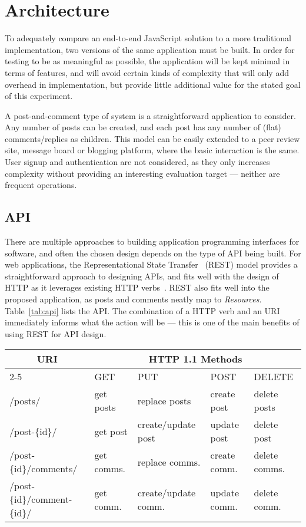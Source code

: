 \section{\label{sec:arch}Architecture}

To adequately compare an end-to-end JavaScript solution to a more traditional implementation, two versions of the same application must be built. In order for testing to be as meaningful as possible, the application will be kept minimal in terms of features, and will avoid certain kinds of complexity that will only add overhead in implementation, but provide little additional value for the stated goal of this experiment.

A post-and-comment type of system is a straightforward application to consider. Any number of posts can be created, and each post has any number of (flat) comments/replies as children. This model can be easily extended to a peer review site, message board or blogging platform, where the basic interaction is the same. User signup and authentication are not considered, as they only increases complexity without providing an interesting evaluation target --- neither are frequent operations.

\subsection{\label{sec:arch:API}API}

There are multiple approaches to building application programming interfaces for software, and often the chosen design depends on the type of API being built. For web applications, the Representational State Transfer~\cite{restful} (REST) model provides a straightforward approach to designing APIs, and fits well with the design of HTTP as it leverages existing HTTP verbs~\cite{rfc2616}. REST also fits well into the proposed application, as posts and comments neatly map to \emph{Resources}. Table~\ref{tab:api} lists the API. The combination of a HTTP verb and an URI immediately informs what the action will be --- this is one of the main benefits of using REST for API design.

\begin{table*}
    \begin{tabular}{*{5}l}
        \toprule
        \multicolumn{1}{c}{\textbf{URI}} & \multicolumn{4}{c}{\textbf{HTTP 1.1 Methods}} \\
        \cmidrule{2-5}
        & GET & PUT & POST & DELETE \\
        \midrule
        /posts/ & get posts & replace posts & create post & delete posts \\
        /post-\{id\}/ & get post & create/update post & update post & delete post \\
        /post-\{id\}/comments/ & get comms. & replace comms. & create comm. & delete comms. \\
        /post-\{id\}/comment-\{id\}/ & get comm. & create/update comm. & update comm. & delete comm. \\
        \bottomrule
    \end{tabular}
    \caption{API methods}
    \label{tab:api}
\end{table*}
